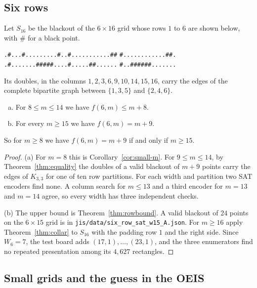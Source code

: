 \subsection{Six rows}

Let $S_{16}$ be the blackout of the $6\times16$ grid whose rows $1$ to $6$ are shown below,
with \# for a black point.
\begin{center}\footnotesize
\texttt{.\#...\#.........\#}\quad \texttt{..\#...........\#\#}\quad
\texttt{\#............\#\#.}\\
\texttt{.\#.......\#\#\#\#\#..}\quad \texttt{..\#.....\#\#......}\quad
\texttt{\#..\#\#\#\#\#\#.......}
\end{center}
Its doubles, in the columns $1,2,3,6,9,10,14,15,16$, carry the edges of the complete bipartite
graph between $\{1,3,5\}$ and $\{2,4,6\}$.

\begin{theorem}\label{thm:sixrow}
\begin{enumerate}[(a)]
\item For $8\le m\le14$ we have $f(6,m)\le m+8$.
\item For every $m\ge15$ we have $f(6,m)=m+9$.
\end{enumerate}
So for $m\ge8$ we have $f(6,m)=m+9$ if and only if $m\ge15$.
\end{theorem}

\begin{proof}
(a) For $m=8$ this is Corollary~\ref{cor:small-m}. For $9\le m\le14$, by
Theorem~\ref{thm:equality} the doubles of a valid blackout of $m+9$ points carry the edges of
$K_{3,3}$ for one of ten row partitions. For each width and partition two SAT encoders find
none. A column search for $m\le13$ and a third encoder for $m=13$ and $m=14$ agree, so every
width has three independent checks.

(b) The upper bound is Theorem~\ref{thm:rowbound}. A valid blackout of $24$ points on the
$6\times15$ grid is in \nolinkurl{jis/data/six_row_sat_w15_A.json}. For $m\ge16$ apply
Theorem~\ref{thm:collar} to $S_{16}$ with the padding row $1$ and the right side. Since
$W_6=7$, the test board adds $(17,1),\dots,(23,1)$, and the three enumerators find no
repeated presentation among its $4{,}627$ rectangles.
\end{proof}

\subsection{Small grids and the guess in the OEIS}

